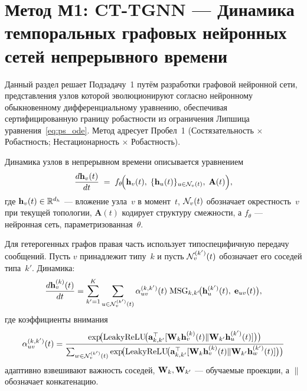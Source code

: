 \section{Метод М1: CT-TGNN --- Динамика темпоральных графовых нейронных сетей непрерывного времени}
\label{sec:ct_tgnn}

Данный раздел решает Подзадачу~1 путём разработки графовой нейронной сети, представления узлов которой эволюционируют согласно нейронному обыкновенному дифференциальному уравнению, обеспечивая сертифицированную границу робастности из ограничения Липшица уравнения~\eqref{eq:ps_ode}. Метод адресует Пробел~1 (Состязательность $\times$ Робастность; Нестационарность $\times$ Робастность).

Динамика узлов в непрерывном времени описывается уравнением
\begin{equation}
\frac{d\mathbf{h}_v(t)}{dt}
\;=\; f_\theta\!\Bigl(\mathbf{h}_v(t),\;\{\mathbf{h}_u(t)\}_{u\in\mathcal{N}_v(t)},\;\mathbf{A}(t)\Bigr),
\label{eq:ct_tgnn_homo}
\end{equation}
где $\mathbf{h}_v(t)\in\mathbb{R}^{d_h}$ --- вложение узла~$v$ в момент~$t$, $\mathcal{N}_v(t)$ обозначает окрестность~$v$ при текущей топологии, $\mathbf{A}(t)$ кодирует структуру смежности, а $f_\theta$ --- нейронная сеть, параметризованная~$\theta$.

Для гетерогенных графов правая часть использует типоспецифичную передачу сообщений. Пусть $v$ принадлежит типу~$k$ и пусть $\mathcal{N}_v^{(k')}(t)$ обозначает его соседей типа~$k'$. Динамика:
\begin{equation}
\frac{d\mathbf{h}_v^{(k)}(t)}{dt}
= \sum_{k'=1}^{K}\sum_{u\in\mathcal{N}_v^{(k')}(t)}
  \alpha_{uv}^{(k,k')}(t)\;\mathrm{MSG}_{k,k'}\!\bigl(
    \mathbf{h}_u^{(k')}(t),\;\mathbf{e}_{uv}(t)\bigr),
\label{eq:ct_tgnn_hetero}
\end{equation}
где коэффициенты внимания~\cite{Velickovic2018}
\begin{equation}
\alpha_{uv}^{(k,k')}(t)
= \frac{
  \exp\!\bigl(\mathrm{LeakyReLU}\!\bigl(
    \mathbf{a}_{k,k'}^\top
    [\mathbf{W}_k\mathbf{h}_v^{(k)}(t)\|\mathbf{W}_{k'}\mathbf{h}_u^{(k')}(t)]
  \bigr)\bigr)
}{
  \sum_{w\in\mathcal{N}_v^{(k')}(t)}
  \exp\!\bigl(\mathrm{LeakyReLU}\!\bigl(
    \mathbf{a}_{k,k'}^\top
    [\mathbf{W}_k\mathbf{h}_v^{(k)}(t)\|\mathbf{W}_{k'}\mathbf{h}_w^{(k')}(t)]
  \bigr)\bigr)
}
\label{eq:ct_tgnn_attn}
\end{equation}
адаптивно взвешивают важность соседей, $\mathbf{W}_k,\mathbf{W}_{k'}$ --- обучаемые проекции, а $\|$ обозначает конкатенацию.


